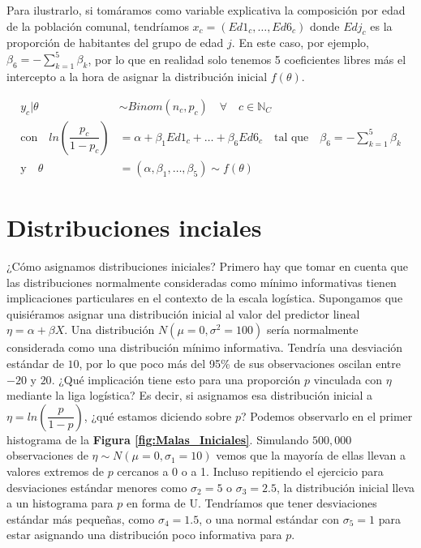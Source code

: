 Para ilustrarlo, si tomáramos como variable explicativa la composición por edad de la población comunal, tendríamos $x_c=(Ed1_c, \dots, Ed6_c)$ donde $Edj_c$ es la proporción de habitantes del grupo de edad $j$. En este caso, por ejemplo, $\beta_{6} = -\sum\limits_{k = 1}^5 \beta_k$, por lo que en realidad solo tenemos 5 coeficientes libres más el intercepto a la hora de asignar la distribución inicial $f(\theta)$. 

\begin{align*}
y_c|\theta & \sim Binom(n_c,p_c) \quad \forall \quad c \in \mathbb{N}_C \\
\text{con} \quad ln\left(\dfrac{p_c}{1-p_c}\right) &= \alpha + \beta_1Ed1_c + \dots + \beta_6Ed6_c \quad \text{tal que} \quad \beta_6 = -\sum\limits_{k = 1}^5 \beta_k \nonumber \\
\text{y} \quad \theta &= (\alpha,\beta_1,\dots,\beta_5) \sim f(\theta) 
\end{align*}

\section{Distribuciones inciales}

¿Cómo asignamos distribuciones iniciales? Primero hay que tomar en cuenta que las distribuciones normalmente consideradas como mínimo informativas tienen implicaciones particulares en el contexto de la escala logística. Supongamos que quisiéramos asignar una distribución inicial al valor del predictor lineal $\eta = \alpha + \beta X$. Una distribución $N(\mu=0,\sigma^2=100)$ sería normalmente considerada como una distribución mínimo informativa. Tendría una desviación estándar de $10$, por lo que poco más del 95\% de sus observaciones oscilan entre $-20$ y $20$. ¿Qué implicación tiene esto para una proporción $p$ vinculada con $\eta$ mediante la liga logística? Es decir, si asignamos esa distribución inicial a $\eta=ln\left(\dfrac{p}{1-p}\right)$, ¿qué estamos diciendo sobre $p$? Podemos observarlo en el primer histograma de la \textbf{Figura \ref{fig:Malas_Iniciales}}. Simulando $500,000$ observaciones de $\eta\sim N(\mu=0,\sigma_1=10)$ vemos que la mayoría de ellas llevan a valores extremos de $p$ cercanos a 0 o a 1. Incluso repitiendo el ejercicio para desviaciones estándar menores como $\sigma_2=5$ o $\sigma_3=2.5$, la distribución inicial lleva a un histograma para $p$ en forma de U. Tendríamos que tener desviaciones estándar más pequeñas, como $\sigma_4=1.5$, o una normal estándar con $\sigma_5=1$ para estar asignando una distribución poco informativa para $p$.\\ 

